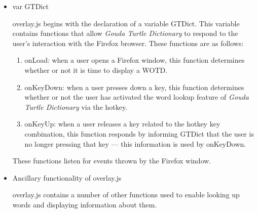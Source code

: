 \documentclass{article}
\begin{document}
\begin{itemize}

\item var GTDict

overlay.js begins with the declaration of a variable GTDict. This variable contains functions that allow \emph{Gouda Turtle Dictionary} to respond to the user's interaction with the Firefox browser. These functions are as follows:

\begin{enumerate}
\item onLoad: when a user opens a Firefox window, this function determines whether or not it is time to display a WOTD.
\item onKeyDown: when a user presses down a key, this function determines whether or not the user has activated the word lookup feature of \emph{Gouda Turtle Dictionary} via the hotkey.
\item onKeyUp: when a user releases a key related to the hotkey key combination, this function responds by informing GTDict that the user is no longer pressing that key --- this information is used by onKeyDown.
\end{enumerate}

These functions listen for events thrown by the Firefox window.

\item Ancillary functionality of overlay.js

overlay.js contains a number of other functions used to enable looking up words and displaying information about them.


\end{itemize}
\end{document}

